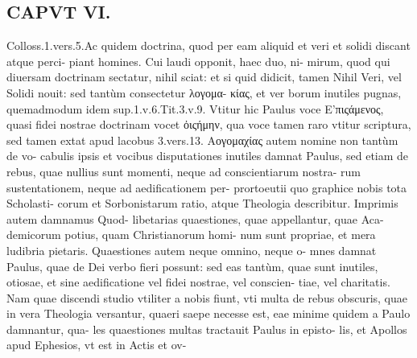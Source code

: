 \documentclass{article}
\begin{document}
\begin{pages}
\section*{CAPVT  VI. }
\marginpar{[ p.427 ]}\pstart Colloss.1.vers.5.Ac quidem doctrina, quod per eam aliquid et veri et solidi discant atque perci- piant homines. Cui laudi opponit, haec duo, ni- mirum, quod qui diuersam doctrinam sectatur, nihil sciat: et si quid didicit, tamen Nihil Veri, vel Solidi nouit: sed tantùm consectetur λογομα- κίας, et ver borum inutiles pugnas, quemadmodum idem sup.1.v.6.Tit.3.v.9. Vtitur hic Paulus voce Ε'πιςάμενος, quasi fidei nostrae doctrinam vocet ὀιςήμην, qua voce tamen raro vtitur scriptura, sed tamen extat apud lacobus 3.vers.13.  \pend\pstart Αογομαχίας autem nomine non tantùm de vo- cabulis ipsis et vocibus disputationes inutiles damnat Paulus, sed etiam de rebus, quae nullius sunt momenti, neque ad conscientiarum nostra- rum sustentationem, neque ad aedificationem per- prortoeutii quo graphice nobis tota Scholasti- corum et Sorbonistarum ratio, atque Theologia describitur. Imprimis autem damnamus Quod- libetarias quaestiones, quae appellantur, quae Aca- demicorum potius, quam Christianorum homi- num sunt propriae, et mera ludibria pietaris.  \pend\pstart Quaestiones autem neque omnino, neque o- mnes damnat Paulus, quae de Dei verbo fieri possunt: sed eas tantùm, quae sunt inutiles, otiosae, et sine aedificatione vel fidei nostrae, vel conscien- tiae, vel charitatis. Nam quae discendi studio vtiliter a nobis fiunt, vti multa de rebus obscuris, quae in vera Theologia versantur, quaeri saepe necesse est, eae minime quidem a Paulo damnantur, qua- les quaestiones multas tractauit Paulus in episto- lis, et Apollos apud Ephesios, vt est in Actis et ov-  \pend

\end{pages}
\end{document}
